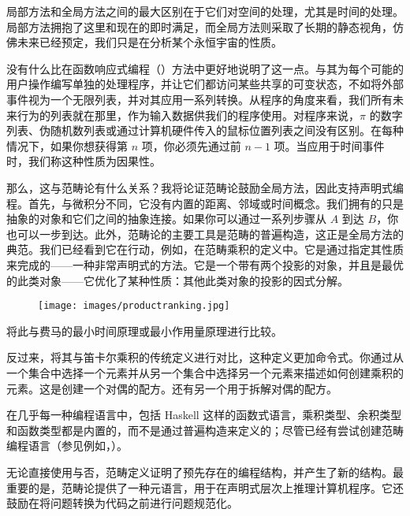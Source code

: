 局部方法和全局方法之间的最大区别在于它们对空间的处理，尤其是时间的处理。局部方法拥抱了这里和现在的即时满足，而全局方法则采取了长期的静态视角，仿佛未来已经预定，我们只是在分析某个永恒宇宙的性质。

没有什么比在函数响应式编程（）方法中更好地说明了这一点。与其为每个可能的用户操作编写单独的处理程序，并让它们都访问某些共享的可变状态，不如将外部事件视为一个无限列表，并对其应用一系列转换。从程序的角度来看，我们所有未来行为的列表就在那里，作为输入数据供我们的程序使用。对程序来说，$\pi$ 的数字列表、伪随机数列表或通过计算机硬件传入的鼠标位置列表之间没有区别。在每种情况下，如果你想获得第 $n$ 项，你必须先通过前 $n-1$ 项。当应用于时间事件时，我们称这种性质为因果性。

那么，这与范畴论有什么关系？我将论证范畴论鼓励全局方法，因此支持声明式编程。首先，与微积分不同，它没有内置的距离、邻域或时间概念。我们拥有的只是抽象的对象和它们之间的抽象连接。如果你可以通过一系列步骤从 $A$ 到达 $B$，你也可以一步到达。此外，范畴论的主要工具是范畴的普遍构造，这正是全局方法的典范。我们已经看到它在行动，例如，在范畴乘积的定义中。它是通过指定其性质来完成的——一种非常声明式的方法。它是一个带有两个投影的对象，并且是最优的此类对象——它优化了某种性质：其他此类对象的投影的因式分解。

\begin{figure}[H]
  \centering
  \texttt{[image: images/productranking.jpg]}
\end{figure}

\noindent
将此与费马的最小时间原理或最小作用量原理进行比较。

反过来，将其与笛卡尔乘积的传统定义进行对比，这种定义更加命令式。你通过从一个集合中选择一个元素并从另一个集合中选择另一个元素来描述如何创建乘积的元素。这是创建一个对偶的配方。还有另一个用于拆解对偶的配方。

在几乎每一种编程语言中，包括 Haskell 这样的函数式语言，乘积类型、余积类型和函数类型都是内置的，而不是通过普遍构造来定义的；尽管已经有尝试创建范畴编程语言（参见例如，）。

无论直接使用与否，范畴定义证明了预先存在的编程结构，并产生了新的结构。最重要的是，范畴论提供了一种元语言，用于在声明式层次上推理计算机程序。它还鼓励在将问题转换为代码之前进行问题规范化。
